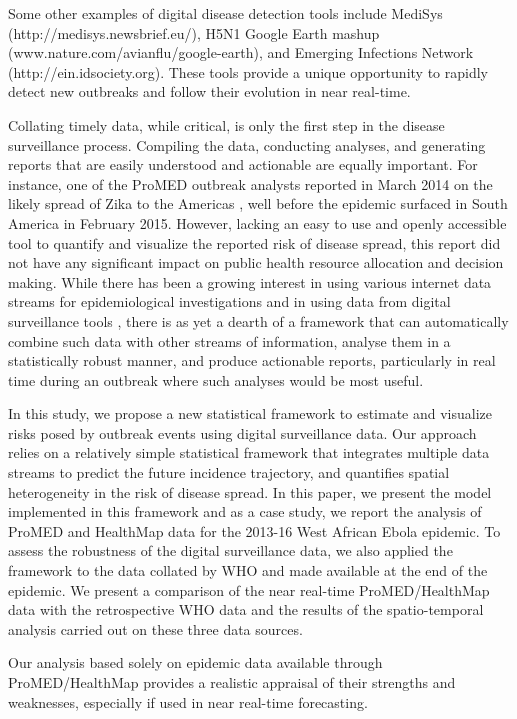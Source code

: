 \documentclass[9pt,twocolumn,twoside,lineno]{pnas-new}
\begin{document}
Some other examples of digital disease detection tools include MediSys
(http://medisys.newsbrief.eu/), H5N1 Google Earth mashup
(www.nature.com/avianflu/google-earth), and Emerging Infections Network
(http://ein.idsociety.org). These tools provide a unique opportunity to
rapidly detect new outbreaks and follow their evolution in near
real-time.

Collating timely data, while critical, is only the first step in the
disease surveillance process. Compiling the data, conducting analyses,
and generating reports that are easily understood and actionable are
equally important. For instance, one of the ProMED outbreak analysts
reported in March 2014 on the likely spread of Zika to the Americas 
\cite{promedzika}, well before the epidemic surfaced in South
America in February 2015. However, lacking an easy to use and openly
accessible tool to quantify and visualize the reported risk of
  disease spread, this report did not have any significant impact on public health resource
allocation and decision making. While there has been a growing interest
in using various internet data streams for epidemiological
investigations \cite{generous2014global, milinovich2015role} and
in using data from digital surveillance tools
\cite{chowell2016elucidating}, there is as yet a dearth of a framework
that can automatically combine such data with other streams of
information, analyse them in a statistically robust manner, and produce
actionable reports, particularly in real time during an outbreak where
such analyses would be most useful.

In this study, we propose a new statistical framework to estimate and
visualize risks posed by outbreak events using digital surveillance
data. Our approach relies on a relatively simple statistical framework
that integrates multiple data streams to predict the future incidence
trajectory, and quantifies spatial heterogeneity in the risk of disease
spread. In this paper, we present the model implemented in this framework
and as a case study, we report the analysis of ProMED and HealthMap data
for the 2013-16 West African Ebola epidemic. To assess the robustness of
the digital surveillance data, we also applied the framework to the data
collated by WHO and made available at
the end of the epidemic. We present a comparison of the near real-time
ProMED/HealthMap data with the retrospective WHO data and the results of
the spatio-temporal analysis carried out on these three data sources.

Our analysis based solely on epidemic data available through
ProMED/HealthMap provides a realistic appraisal of their strengths and
weaknesses, especially if used in near real-time forecasting.
\end{document}
